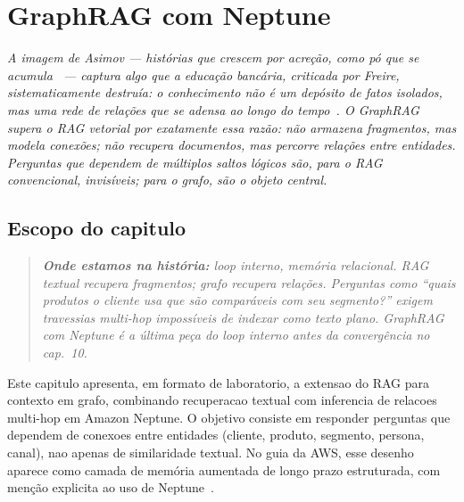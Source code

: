 \chapter{GraphRAG com Neptune}
\label{chap:graphrag_neptune}

{\small\itshape\color{AccentGray}
A imagem de Asimov --- hist\'{o}rias que crescem por acre\c{c}\~{a}o, como p\'{o} que se acumula~\cite{asimov1982foundationsedge} --- captura algo que a educa\c{c}\~{a}o banc\'{a}ria, criticada por Freire, sistematicamente destru\'{i}a: o conhecimento n\~{a}o \'{e} um dep\'{o}sito de fatos isolados, mas uma rede de rela\c{c}\~{o}es que se adensa ao longo do tempo~\cite{freire1968pedagogia}. O GraphRAG supera o RAG vetorial por exatamente essa raz\~{a}o: n\~{a}o armazena fragmentos, mas modela conex\~{o}es; n\~{a}o recupera documentos, mas percorre rela\c{c}\~{o}es entre entidades. Perguntas que dependem de m\'{u}ltiplos saltos l\'{o}gicos s\~{a}o, para o RAG convencional, invis\'{i}veis; para o grafo, s\~{a}o o objeto central.\par}
\vspace{0.6em}
\section{Escopo do capitulo}

\begin{quote}\itshape
\textbf{Onde estamos na hist\'oria:} loop interno, mem\'oria relacional.
RAG textual recupera fragmentos; grafo recupera rela\c{c}\~oes. Perguntas
como ``quais produtos o cliente usa que s\~ao compar\'aveis com seu segmento?''
exigem travessias multi-hop imposs\'iveis de indexar como texto plano.
GraphRAG com Neptune \'e a \'ultima pe\c{c}a do loop interno antes da
converg\^encia no cap.~10.
\end{quote}

Este capitulo apresenta, em formato de laboratorio, a extensao do RAG para
contexto em grafo, combinando recuperacao textual com inferencia de relacoes
multi-hop em Amazon Neptune. O objetivo consiste
em responder perguntas que dependem de conexoes entre entidades (cliente,
produto, segmento, persona, canal), nao apenas de similaridade textual.
No guia da AWS, esse desenho aparece como camada de mem\'oria aumentada
de longo prazo estruturada, com men\c{c}\~ao explicita ao uso de Neptune~\cite{awsagentic2025}.

